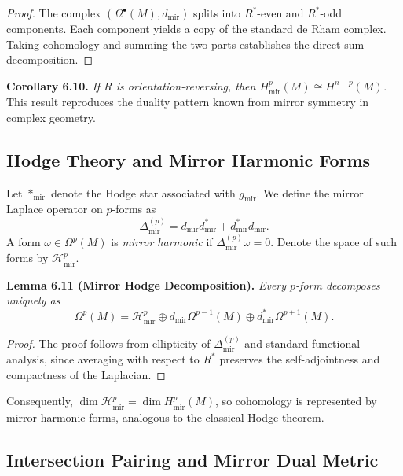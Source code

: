 \begin{proof}
The complex \((\Omega^{\bullet}(M),d_{\mathrm{mir}})\)
splits into \(R^{*}\)-even and \(R^{*}\)-odd components.
Each component yields a copy of the standard de Rham complex.
Taking cohomology and summing the two parts
establishes the direct-sum decomposition.
\end{proof}

\noindent
\textbf{Corollary 6.10.}
\emph{If \(R\) is orientation-reversing,
then \(H^{p}_{\mathrm{mir}}(M)\cong H^{n-p}(M)\).}
This result reproduces the duality pattern
known from mirror symmetry in complex geometry.

\subsection{Hodge Theory and Mirror Harmonic Forms}\relax \hspace{0pt}

Let \(*_{\mathrm{mir}}\) denote the Hodge star associated with \(g_{\mathrm{mir}}\).
We define the mirror Laplace operator on \(p\)-forms as
\begin{equation}
\Delta_{\mathrm{mir}}^{(p)}
=d_{\mathrm{mir}}d_{\mathrm{mir}}^{*}
+d_{\mathrm{mir}}^{*}d_{\mathrm{mir}}.
\end{equation}
A form \(\omega\in\Omega^{p}(M)\)
is \emph{mirror harmonic} if \(\Delta_{\mathrm{mir}}^{(p)}\omega=0\).
Denote the space of such forms by \(\mathcal{H}^{p}_{\mathrm{mir}}\).

\noindent
\textbf{Lemma 6.11 (Mirror Hodge Decomposition).}
\emph{Every \(p\)-form decomposes uniquely as}
\[
\Omega^{p}(M)
=\mathcal{H}^{p}_{\mathrm{mir}}
\oplus d_{\mathrm{mir}}\Omega^{p-1}(M)
\oplus d_{\mathrm{mir}}^{*}\Omega^{p+1}(M).
\]

\begin{proof}
The proof follows from ellipticity of \(\Delta_{\mathrm{mir}}^{(p)}\)
and standard functional analysis,
since averaging with respect to \(R^{*}\)
preserves the self-adjointness and compactness of the Laplacian.
\end{proof}

Consequently,
\(\dim \mathcal{H}^{p}_{\mathrm{mir}}=\dim H^{p}_{\mathrm{mir}}(M)\),
so cohomology is represented by mirror harmonic forms,
analogous to the classical Hodge theorem.

\subsection{Intersection Pairing and Mirror Dual Metric}\relax \hspace{0pt}

